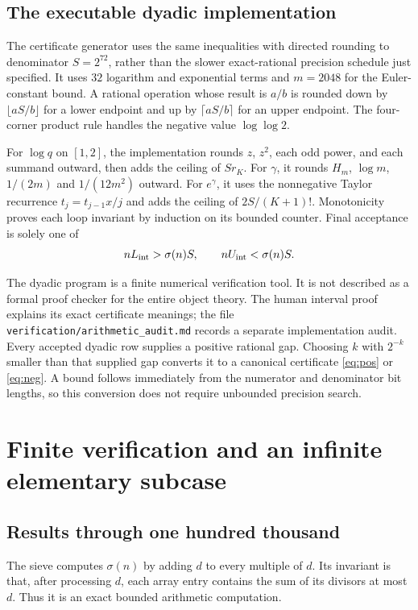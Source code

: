 \documentclass[11pt,a4paper]{article}
\theoremstyle{definition}
\newcommand{\code}[1]{\texttt{\small #1}}
\begin{document}
\subsection{The executable dyadic implementation}

The certificate generator uses the same inequalities with directed
rounding to denominator $S=2^{72}$, rather than the slower exact-rational
precision schedule just specified. It uses $32$ logarithm and exponential
terms and $m=2048$ for the Euler-constant bound. A rational operation
whose result is $a/b$ is rounded down by $\lfloor aS/b\rfloor$ for a
lower endpoint and up by $\lceil aS/b\rceil$ for an upper endpoint.
The four-corner product rule handles the negative value $\log\log2$.

For $\log q$ on $[1,2]$, the implementation rounds $z$, $z^2$, each odd
power, and each summand outward, then adds the ceiling of $Sr_K$.
For $\gamma$, it rounds $H_m$, $\log m$, $1/(2m)$ and $1/(12m^2)$
outward. For $e^\gamma$, it uses the nonnegative Taylor recurrence
$t_j=t_{j-1}x/j$ and adds the ceiling of $2S/(K+1)!$.
Monotonicity proves each loop invariant by induction on its bounded
counter. Final acceptance is solely one of
\[
 nL_{\rm int}>\sigma(n)S,\qquad
 nU_{\rm int}<\sigma(n)S.
\]

The dyadic program is a finite numerical verification tool. It is not
described as a formal proof checker for the entire object theory.
The human interval proof explains its exact certificate meanings;
the file \code{verification/arithmetic\_audit.md} records a separate
implementation audit.
Every accepted dyadic row supplies a positive rational gap. Choosing
$k$ with $2^{-k}$ smaller than that supplied gap converts it to a
canonical certificate \eqref{eq:pos} or \eqref{eq:neg}. A bound follows
immediately from the numerator and denominator bit lengths, so this
conversion does not require unbounded precision search.

\section{Finite verification and an infinite elementary subcase}

\subsection{Results through one hundred thousand}

The sieve computes $\sigma(n)$ by adding $d$ to every multiple of $d$.
Its invariant is that, after processing $d$, each array entry contains
the sum of its divisors at most $d$. Thus it is an exact bounded
arithmetic computation.
\end{document}
